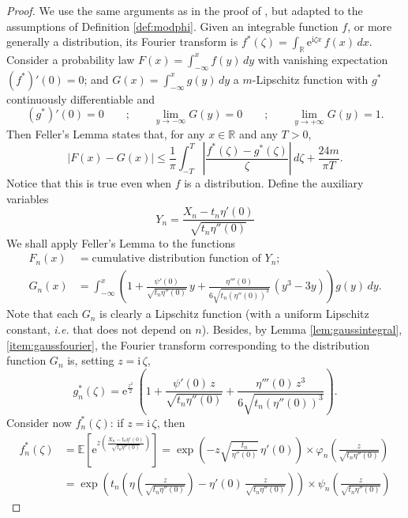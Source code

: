 \documentclass[12pt,a4paper,reqno]{amsart}
\theoremstyle{remark}
\newcommand{\R}{\mathbb{R}}
\newcommand{\E}{\mathrm{e}}
\newcommand{\I}{\mathrm{i}}
\newcommand{\esper}{\mathbb{E}}
\begin{document}
\begin{proof}
We use the same arguments as in the proof of \cite[Theorem XVI.4.1]{Fel71}, but adapted to the assumptions of Definition \ref{def:modphi}. Given an integrable function $f$, or more generally a distribution, its Fourier transform is $f^{*}(\zeta)=\int_{\R}\E^{\I \zeta x}\,f(x)\,dx.$
Consider a probability law $F(x)=\int_{-\infty}^{x}f(y)\,dy$ with vanishing expectation $(f^{*})'(0)=0$; and $G(x)=\int_{-\infty}^{x}g(y)\,dy$ a $m$-Lipschitz function with $g^{*}$ continuously differentiable and
$$(g^{*})'(0)=0 \qquad;\qquad \lim_{y \to -\infty}G(y)=0\qquad ;\qquad\lim_{y \to +\infty}G(y)=1.$$ 
Then Feller's Lemma \cite[Lemma XVI.3.2]{Fel71} states that, for any $x\in \R$ and any $T>0$,
$$|F(x)-G(x)|\leq \frac{1}{\pi} \int_{-T}^{T} \left|\frac{f^{*}(\zeta)-g^{*}(\zeta)}{\zeta}\right|\, d\zeta +\frac{24m}{\pi T}.$$
Notice that this is true even when $f$ is a distribution. Define the auxiliary variables
$$Y_{n}=\frac{X_{n}-t_{n}\eta'(0)}{\sqrt{t_{n}\eta''(0)}}$$
We shall apply Feller's Lemma to the functions
\begin{align*}
    F_{n}(x)&=\text{cumulative distribution function of } 
    Y_n;\\
G_{n}(x)&=\int_{-\infty}^{x}\left(1+\frac{\psi'(0)}{\sqrt{t_{n}\eta''(0)}}\,y+\frac{\eta'''(0)}{6\sqrt{t_{n}(\eta''(0))^{3}}}\,(y^{3}-3y)\right)g(y)\,dy.
\end{align*}
Note that each $G_n$ is clearly a Lipschitz function (with a uniform Lipschitz constant, \emph{i.e.} that does not depend on $n$). Besides, by Lemma \ref{lem:gaussintegral}, \eqref{item:gaussfourier}, the Fourier transform corresponding to the distribution function $G_n$ is, setting $z=\I\, \zeta$,
\begin{equation}\label{eq:gnstar}
    g_n^*(\zeta)= \E^{\frac{z^{2}}{2}}\,\left(1+\frac{\psi'(0)\,z}{\sqrt{t_{n}\eta''(0)}}+\frac{\eta'''(0)\,z^{3}}{6\sqrt{t_{n}(\eta''(0))^{3}}}\right).
\end{equation}
Consider now $f_{n}^{*}(\zeta)$:
if $z=\I\, \zeta$, then
\begin{align*}
    f_{n}^{*}(\zeta) &= \esper \left[\E^{z\left(\frac{X_{n}-t_{n}\eta'(0)}{\sqrt{t_{n}\eta''(0)}}\right)}\right]=\exp\left(-z\sqrt{\frac{t_{n}}{\eta''(0)}}\,\eta'(0)\right)\times \varphi_{n}\left(\frac{z}{\sqrt{t_{n}\eta''(0)}}\right)\\
&=\exp\left(t_{n}\left(\eta\left(\frac{z}{\sqrt{t_{n}\eta''(0)}}\right)-\eta'(0)\,\frac{z}{\sqrt{t_{n}\eta''(0)}}\right)\right)\times \psi_{n}\!\left(\frac{z}{\sqrt{t_{n}\eta''(0)}}\right)

\end{align*}
\end{proof}
\end{document}
